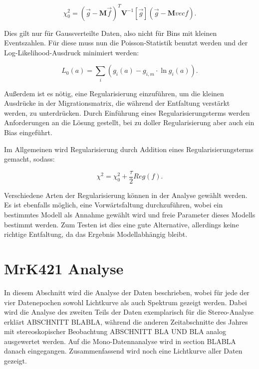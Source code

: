 \begin{equation}
 \chi_0^2=(\vec{g}-\mathbf{M}\vec{f})^T \mathbf{V}^{-1}[\vec{g}](\vec{g}-\mathbf{M}vec{f}).
\end{equation}

Dies gilt nur für Gaussverteilte Daten, also nicht für Bins mit kleinen Eventszahlen.
Für diese muss nun die Poisson-Statistik benutzt werden und der Log-Likelihood-Ausdruck minimiert werden:

\begin{equation}
 L_0(a)=\sum_i (g_i(a)-g_{i,m}\cdot \ln g_i(a)).
\end{equation}

Außerdem ist es nötig, eine Regularisierung einzuführen, um die kleinen Ausdrücke in der Migrationsmatrix, die während der Entfaltung verstärkt werden, zu unterdrücken.
Durch Einführung eines Regularisierungsterms werden Anforderungen an die Lösung gestellt, bei zu doller Regularisierung aber auch ein Bias eingeführt.

Im Allgemeinen wird Regularisierung durch Addition eines Regularisierungsterms gemacht, sodass:

\begin{equation}
 \chi^2=\chi_0^2 +\frac{\tau}{2} Reg(f).
\end{equation}

Verschiedene Arten der Regularisierung können in der Analyse gewählt werden.
Es ist ebenfalls möglich, eine Vorwärtsfaltung durchzuführen, wobei ein bestimmtes Modell als Annahme gewählt wird und freie Parameter dieses Modells bestimmt werden.
Zum Testen ist dies eine gute Alternative, allerdings keine richtige Entfaltung, da das Ergebnis Modellabhängig bleibt.

\section{MrK421 Analyse}
In diesem Abschnitt wird die Analyse der Daten beschrieben, wobei für jede der vier Datenepochen sowohl Lichtkurve als auch Spektrum gezeigt werden.
Dabei wird die Analyse des zweiten Teils der Daten exemplarisch für die Stereo-Analyse erklärt ABSCHNITT BLABLA, während die anderen Zeitabschnitte des Jahres mit stereoskopischer Beobachtung ABSCHNITT BLA UND BLA analog ausgewertet werden.
Auf die Mono-Datennanalyse wird in section BLABLA danach eingegangen.
Zusammenfassend wird noch eine Lichtkurve aller Daten gezeigt.


